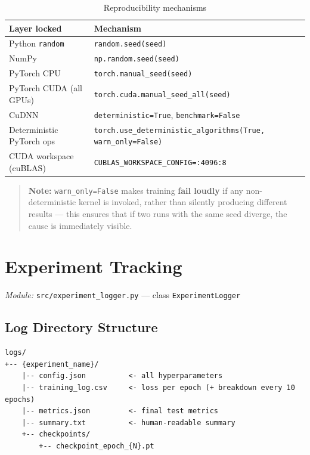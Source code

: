 \documentclass[12pt,a4paper]{article}
\newcommand{\codeinline}[1]{\texttt{\small #1}}
\begin{document}
\begin{table}[H]
\centering
\begin{tabular}{L{4.5cm} L{8.5cm}}
\toprule
\textbf{Layer locked} & \textbf{Mechanism} \\
\midrule
Python \codeinline{random}    & \codeinline{random.seed(seed)} \\
NumPy                         & \codeinline{np.random.seed(seed)} \\
PyTorch CPU                   & \codeinline{torch.manual\_seed(seed)} \\
PyTorch CUDA (all GPUs)       & \codeinline{torch.cuda.manual\_seed\_all(seed)} \\
CuDNN                         & \codeinline{deterministic=True}, \codeinline{benchmark=False} \\
Deterministic PyTorch ops     & \codeinline{torch.use\_deterministic\_algorithms(True, warn\_only=False)} \\
CUDA workspace (cuBLAS)       & \codeinline{CUBLAS\_WORKSPACE\_CONFIG=:4096:8} \\
\bottomrule
\end{tabular}
\caption{Reproducibility mechanisms}
\end{table}

\begin{quote}
\textbf{Note:} \codeinline{warn\_only=False} makes training \textbf{fail loudly} if any non-deterministic kernel is invoked, rather than silently producing different results — this ensures that if two runs with the same seed diverge, the cause is immediately visible.
\end{quote}

\section{Experiment Tracking}

\textit{Module:} \codeinline{src/experiment\_logger.py} — class \codeinline{ExperimentLogger}

\subsection{Log Directory Structure}

\begin{lstlisting}
logs/
+-- {experiment_name}/
    |-- config.json          <- all hyperparameters
    |-- training_log.csv     <- loss per epoch (+ breakdown every 10 epochs)
    |-- metrics.json         <- final test metrics
    |-- summary.txt          <- human-readable summary
    +-- checkpoints/
        +-- checkpoint_epoch_{N}.pt
\end{lstlisting}
\end{document}
